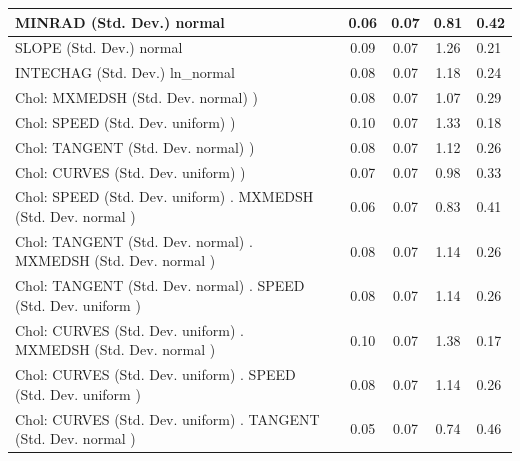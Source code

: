 \begin{table}
\begin{center}
\begin{tabular}{|l|l|c|c|c|l|}
			\hline
			MINRAD (Std. Dev.) normal &  & 0.06 & 0.07 & 0.81 & 0.42 \\
			\hline
			SLOPE (Std. Dev.) normal &  & 0.09 & 0.07 & 1.26 & 0.21 \\
			\hline
			INTECHAG (Std. Dev.) ln_normal &  & 0.08 & 0.07 & 1.18 & 0.24 \\
			\hline
			 Chol: MXMEDSH (Std. Dev. normal) ) &  & 0.08 & 0.07 & 1.07 & 0.29 \\
			\hline
			 Chol: SPEED (Std. Dev. uniform) ) &  & 0.10 & 0.07 & 1.33 & 0.18 \\
			\hline
			 Chol: TANGENT (Std. Dev. normal) ) &  & 0.08 & 0.07 & 1.12 & 0.26 \\
			\hline
			 Chol: CURVES (Std. Dev. uniform) ) &  & 0.07 & 0.07 & 0.98 & 0.33 \\
			\hline
			 Chol: SPEED (Std. Dev. uniform) . MXMEDSH (Std. Dev.   normal ) &  & 0.06 & 0.07 & 0.83 & 0.41 \\
			\hline
			 Chol: TANGENT (Std. Dev. normal) . MXMEDSH (Std. Dev.   normal ) &  & 0.08 & 0.07 & 1.14 & 0.26 \\
			\hline
			 Chol: TANGENT (Std. Dev. normal) . SPEED (Std. Dev.   uniform ) &  & 0.08 & 0.07 & 1.14 & 0.26 \\
			\hline
			 Chol: CURVES (Std. Dev. uniform) . MXMEDSH (Std. Dev.   normal ) &  & 0.10 & 0.07 & 1.38 & 0.17 \\
			\hline
			 Chol: CURVES (Std. Dev. uniform) . SPEED (Std. Dev.   uniform ) &  & 0.08 & 0.07 & 1.14 & 0.26 \\
			\hline
			 Chol: CURVES (Std. Dev. uniform) . TANGENT (Std. Dev.   normal ) &  & 0.05 & 0.07 & 0.74 & 0.46 \\
			\hline
		\end{tabular}
	\end{center}
\end{table}